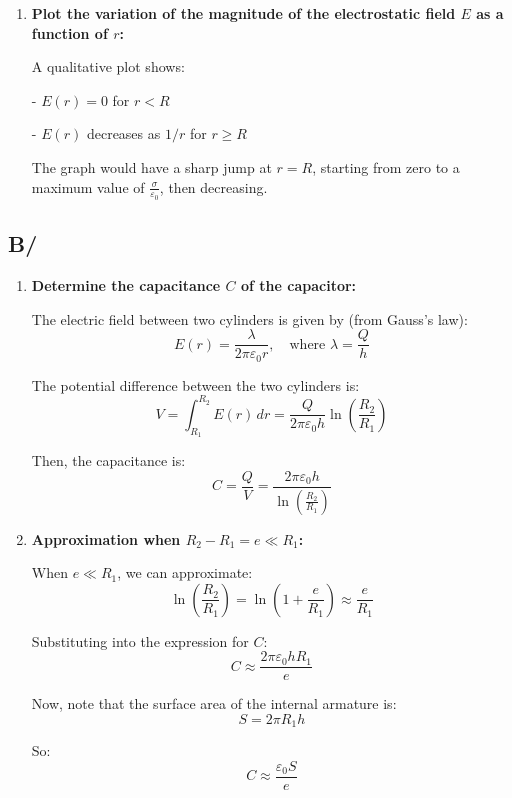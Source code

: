 \documentclass[12pt]{article}
\begin{document}
\begin{answerbox}
\begin{enumerate}
        \item \textbf{Plot the variation of the magnitude of the electrostatic field $E$ as a function of $r$:}
    
            A qualitative plot shows:
            
                
    - $E(r) = 0$ for $r < R$
                
    - $E(r)$ decreases as $1/r$ for $r \geq R$
            
    
            The graph would have a sharp jump at $r = R$, starting from zero to a maximum value of $\frac{\sigma}{\varepsilon_0}$, then decreasing.
    
    \end{enumerate}

\subsection*{B/}
    \begin{enumerate}
        \item \textbf{Determine the capacitance $C$ of the capacitor:}
    
            The electric field between two cylinders is given by (from Gauss’s law):
            $$
            E(r) = \frac{\lambda}{2\pi\varepsilon_0 r}, \quad \text{where } \lambda = \frac{Q}{h}
            $$
    
            The potential difference between the two cylinders is:
            $$
            V = \int_{R_1}^{R_2} E(r)\,dr = \frac{Q}{2\pi\varepsilon_0 h} \ln\left(\frac{R_2}{R_1}\right)
            $$
    
            Then, the capacitance is:
            $$
            C = \frac{Q}{V} = \frac{2\pi\varepsilon_0 h}{\ln\left(\frac{R_2}{R_1}\right)}
            $$
    
        \item \textbf{Approximation when $R_2 - R_1 = e \ll R_1$:}
    
            When $e \ll R_1$, we can approximate:
            $$
            \ln\left(\frac{R_2}{R_1}\right) = \ln\left(1 + \frac{e}{R_1}\right) \approx \frac{e}{R_1}
            $$
    
            Substituting into the expression for $C$:
            $$
            C \approx \frac{2\pi\varepsilon_0 h R_1}{e}
            $$
    
            Now, note that the surface area of the internal armature is:
            $$
            S = 2\pi R_1 h
            $$
    
            So:
            $$
            C \approx \frac{\varepsilon_0 S}{e}
            $$
    
    \end{enumerate}
\end{answerbox}

\end{document}
